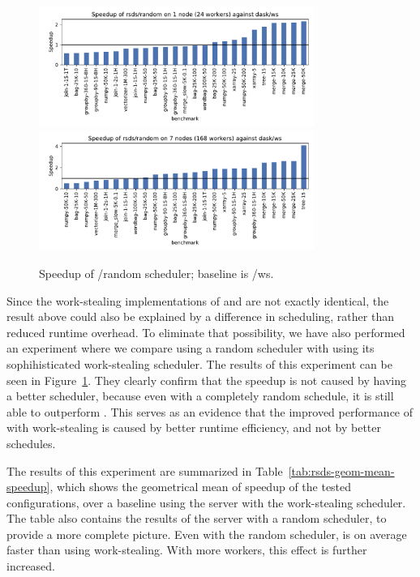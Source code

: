 \begin{figure}
	\centering
	\includegraphics[width=0.8\textwidth]{./imgs/rsds/charts/speedup-rsds-random-1}
	\includegraphics[width=0.8\textwidth]{./imgs/rsds/charts/speedup-rsds-random-7}
	\caption{Speedup of \dask{}/random scheduler; baseline is \dask{}/ws.}
	\label{fig:rsds-dask-random-all}
\end{figure}

Since the work-stealing implementations of \rsds{} and
\dask{} are not exactly identical, the result above could also be explained by
a difference in scheduling, rather than reduced runtime overhead. To eliminate that possibility, we
have also performed an experiment where we compare \rsds{} using a random
scheduler with \dask{} using its sophihisticated work-stealing scheduler. The
results of this experiment can be seen in Figure~\ref{fig:rsds-dask-random-all}. They clearly confirm
that the speedup is not caused by \rsds{} having a better scheduler, because
even with a completely random schedule, it is still able to outperform \dask{}.
This serves as an evidence that the improved performance of \rsds{} with
work-stealing is caused by better runtime efficiency, and not by better schedules.

The results of this experiment are summarized in Table~\ref{tab:rsds-geom-mean-speedup}, which shows the
geometrical mean of speedup of the tested \rsds{} configurations, over a
baseline using the \dask{} server with the work-stealing scheduler. The table
also contains the results of the \dask{} server with a random scheduler, to
provide a more complete picture. Even with the random scheduler, \rsds{} is on
average faster than \dask{} using work-stealing. With more workers, this effect
is further increased.

